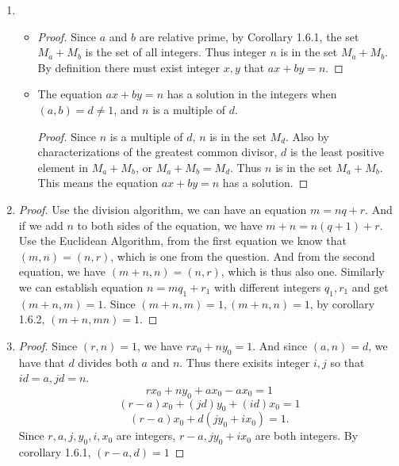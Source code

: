 \documentclass[11pt,a4paper]{article}
\begin{document}
\hrulefill

\begin{enumerate}
	\item
	\begin{itemize}
		\item \begin{proof} Since $a$ and $b$ are relative prime, by Corollary 1.6.1, the set $M_a+M_b$ is the set of all integers. Thus integer $n$ is in the set $M_a+M_b$. By definition there must exist integer $x, y$ that \(ax+by = n.\)\end{proof}
		\item The equation \(ax+by = n\) has a solution in the integers when \((a,b)= d \ne 1\), and $n$ is a multiple of $d$. \begin{proof} Since $n$ is a multiple of $d$, $n$ is in the set $M_d$. Also by characterizations of the greatest common divisor, $d$ is the least positive element in $M_a+M_b$, or $M_a+M_b = M_d$. Thus $n$ is in the set $M_a+M_b$. This means the equation \(ax+by = n\) has a solution.\end{proof}

	\end{itemize}

	\item \begin{proof} Use the division algorithm, we can have an equation $m = nq +r$. And if we add $n$ to both sides of the equation, we have $m+n = n(q+1) +r$. Use the Euclidean Algorithm, from the first equation we know that $(m,n)=(n, r)$, which is one from the question. And from the second equation, we have $(m+n, n) = (n, r)$, which is thus also one. Similarly we can establish equation $n=mq_1+r_1$ with different integers $q_1, r_1$ and get $(m+n, m) = 1$. Since $(m+n, m) = 1, (m+n, n) = 1$, by corollary 1.6.2, $(m+n, mn) =1.$\end{proof}

	\item \begin{proof} Since $(r,n)=1$, we have $rx_0+ny_0=1.$ And since $(a,n)=d$, we have that $d$ divides both $a$ and $n$. Thus there exisits integer $i, j$ so that $id=a, jd=n$.
	\[rx_0+ny_0+ax_0-ax_0=1\] \[(r-a)x_0+(jd)y_0+(id)x_0=1\] \[(r-a)x_0+d(jy_0+ix_0)=1.\] Since $r, a, j, y_0, i, x_0$ are integers, $r-a, jy_0+ix_0$ are both integers. By corollary 1.6.1, \((r-a,d)=1\)\end{proof}


\end{enumerate}
\end{document}
